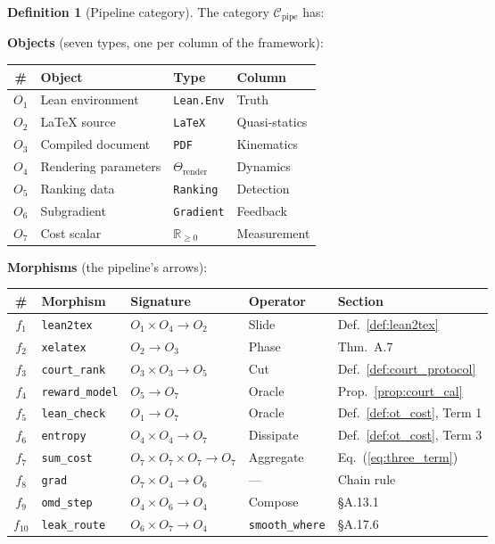 \documentclass[11pt,a4paper]{article}
\theoremstyle{definition}
\newtheorem{definition}[theorem]{Definition}
\theoremstyle{remark}
\begin{document}
\begin{definition}[Pipeline category]\label{def:pipe_cat}
The category $\mathcal{C}_{\mathrm{pipe}}$ has:

\textbf{Objects} (seven types, one per column of the framework):
\begin{center}
\small
\begin{tabular}{clll}
\toprule
\# & \textbf{Object} & \textbf{Type} & \textbf{Column} \\
\midrule
$O_1$ & Lean environment & \texttt{Lean.Env} & Truth \\
$O_2$ & \LaTeX{} source & \texttt{LaTeX} & Quasi-statics \\
$O_3$ & Compiled document & \texttt{PDF} & Kinematics \\
$O_4$ & Rendering parameters & $\Theta_{\mathrm{render}}$ & Dynamics \\
$O_5$ & Ranking data & \texttt{Ranking} & Detection \\
$O_6$ & Subgradient & \texttt{Gradient} & Feedback \\
$O_7$ & Cost scalar & $\mathbb{R}_{\geq 0}$ & Measurement \\
\bottomrule
\end{tabular}
\end{center}

\textbf{Morphisms} (the pipeline's arrows):
\begin{center}
\small
\begin{tabular}{cllll}
\toprule
\# & \textbf{Morphism} & \textbf{Signature} & \textbf{Operator} & \textbf{Section} \\
\midrule
$f_1$ & \texttt{lean2tex} & $O_1 \times O_4 \to O_2$ & Slide & Def.~\ref{def:lean2tex} \\
$f_2$ & \texttt{xelatex} & $O_2 \to O_3$ & Phase & Thm.~A.7 \\
$f_3$ & \texttt{court\_rank} & $O_3 \times O_3 \to O_5$ & Cut & Def.~\ref{def:court_protocol} \\
$f_4$ & \texttt{reward\_model} & $O_5 \to O_7$ & Oracle & Prop.~\ref{prop:court_cal} \\
$f_5$ & \texttt{lean\_check} & $O_1 \to O_7$ & Oracle & Def.~\ref{def:ot_cost}, Term 1 \\
$f_6$ & \texttt{entropy} & $O_4 \times O_4 \to O_7$ & Dissipate & Def.~\ref{def:ot_cost}, Term 3 \\
$f_7$ & \texttt{sum\_cost} & $O_7 \times O_7 \times O_7 \to O_7$ & Aggregate & Eq.~(\ref{eq:three_term}) \\
$f_8$ & \texttt{grad} & $O_7 \times O_4 \to O_6$ & --- & Chain rule \\
$f_9$ & \texttt{omd\_step} & $O_4 \times O_6 \to O_4$ & Compose & \S A.13.1 \\
$f_{10}$ & \texttt{leak\_route} & $O_6 \times O_7 \to O_4$ & \texttt{smooth\_where} & \S A.17.6 \\
\bottomrule
\end{tabular}
\end{center}
\end{definition}
\end{document}

